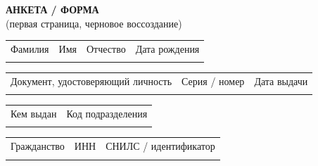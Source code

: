 \documentclass[12pt]{article}
\newcommand{\smalllabel}[1]{{\fontsize{9}{10}\selectfont #1}}
\begin{document}
\begin{center}
    {\large\bfseries АНКЕТА / ФОРМА}\\[4pt]
    {\smalllabel{(первая страница, черновое воссоздание)}}
\end{center}

\vspace{4mm}

\begin{tabularx}{\textwidth}{|L{0.24\textwidth}|L{0.24\textwidth}|L{0.24\textwidth}|L{0.24\textwidth}|}
\hline
\smalllabel{Фамилия} &
\smalllabel{Имя} &
\smalllabel{Отчество} &
\smalllabel{Дата рождения} \\
\vspace{4mm} & & & \\
\hline
\end{tabularx}

\vspace{2mm}

\begin{tabularx}{\textwidth}{|L{0.32\textwidth}|L{0.32\textwidth}|L{0.32\textwidth}|}
\hline
\smalllabel{Документ, удостоверяющий личность} &
\smalllabel{Серия / номер} &
\smalllabel{Дата выдачи} \\
\vspace{4mm} & & \\
\hline
\end{tabularx}

\vspace{2mm}

\begin{tabularx}{\textwidth}{|L{0.49\textwidth}|L{0.49\textwidth}|}
\hline
\smalllabel{Кем выдан} &
\smalllabel{Код подразделения} \\
\vspace{6mm} & \\
\hline
\end{tabularx}

\vspace{2mm}

\begin{tabularx}{\textwidth}{|L{0.32\textwidth}|L{0.32\textwidth}|L{0.32\textwidth}|}
\hline
\smalllabel{Гражданство} &
\smalllabel{ИНН} &
\smalllabel{СНИЛС / идентификатор} \\
\vspace{4mm} & & \\
\hline
\end{tabularx}

\vspace{3mm}
\end{document}
